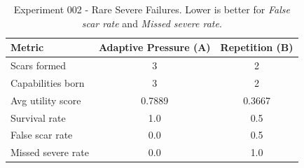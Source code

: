\begin{table}[h]
\centering
\caption{Experiment 002 - Rare Severe Failures. Lower is better for \textit{False scar rate} and \textit{Missed severe rate}.}
\label{tab:exp002}
\begin{tabular}{lcc}
\hline
\textbf{Metric} & \textbf{Adaptive Pressure (A)} & \textbf{Repetition (B)} \\
\hline
Scars formed & 3 & 2 \\
Capabilities born & 3 & 2 \\
Avg utility score & 0.7889 & 0.3667 \\
Survival rate & 1.0 & 0.5 \\
False scar rate & 0.0 & 0.5 \\
Missed severe rate & 0.0 & 1.0 \\
\hline
\end{tabular}
\end{table}